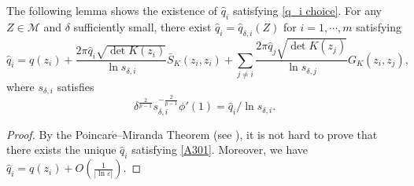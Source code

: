 \documentclass[12pt,reqno]{amsart}
\numberwithin{equation}{section}
\theoremstyle{definition}
\newenvironment{customthm}[1]
{\renewcommand\theinnercustomthm{#1}\innercustomthm}
{\endinnercustomthm}
\theoremstyle{remark}
\begin{document}
 

\iffalse

The following lemma shows the existence of $ \hat{q}_i $ satisfying \eqref{q_i choice}.
\begin{customthm}{A.2}\label{lemA-3}
For any $ Z\in \mathcal{M} $ and $ \delta $ sufficiently small,  there exist $ \hat{q}_i=\hat{q}_{\delta,i}(Z) $ for $ i=1,\cdots,m $ satisfying
\begin{equation}\label{A301}
\hat{q}_i=q(z_i)+\frac{2\pi\hat{q}_i\sqrt{\det K(z_i)}}{\ln s_{\delta,i}}\bar{S}_K(z_i, z_i)+\sum_{j\neq i}\frac{2\pi\hat{q}_j\sqrt{\det K(z_j)}}{\ln s_{\delta,j}}G_K(z_i, z_j),
\end{equation}
where $ s_{\delta,i} $ satisfies
\begin{equation*}
\delta^{\frac{2}{p-1}}s_{\delta,i}^{-\frac{2}{p-1}}\phi'(1)=\hat{q}_i/\ln s_{\delta,i}.
\end{equation*}


\end{customthm}
\begin{proof}
By the Poincar$\acute{\text{e}}$--Miranda Theorem (see \cite{Ku}), it is not hard to prove that there exists the unique $ \hat{q}_i $ satisfying \eqref{A301}. Moreover, we have $ \hat{q}_i=q(z_i)+O(\frac{1}{|\ln\varepsilon|}) $.
\end{proof}
\end{document}

